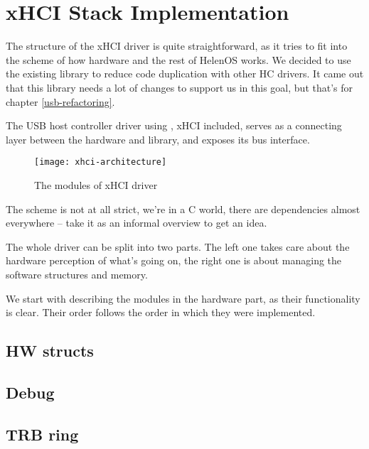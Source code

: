 \chapter{xHCI Stack Implementation}

The structure of the xHCI driver is quite straightforward, as it tries to fit
into the scheme of how hardware and the rest of HelenOS works. We decided to
use the existing library  to reduce code duplication with
other HC drivers. It came out that this library needs a lot of changes to
support us in this goal, but that's for chapter \ref{usb-refactoring}.

The USB host controller driver using , xHCI included, serves as
a connecting layer between the hardware and library, and exposes its bus
interface.

\begin{figure}[h]
	\centering
	\texttt{[image: xhci-architecture]}
	\caption{The modules of xHCI driver}
\end{figure}

The scheme is not at all strict, we're in a C world, there are dependencies
almost everywhere -- take it as an informal overview to get an idea.

The whole driver can be split into two parts. The left one takes care about the
hardware perception of what's going on, the right one is about managing the
software structures and memory.

We start with describing the modules in the hardware part, as their
functionality is clear. Their order follows the order in which they were
implemented.

\section{HW structs}



\section{Debug}


\section{TRB ring}

